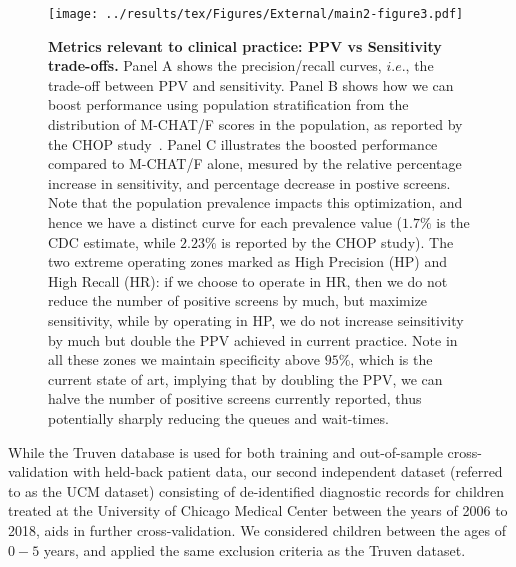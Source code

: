 \documentclass[onecolumn, compsoc,11pt]{IEEEtran}
\renewcommand{\captionN}[1]{\caption{\color{CadetBlue4!80!black} \sffamily \fontsize{9}{10}\selectfont #1  }}
\begin{document}
\begin{figure}[t]
  \tikzexternalenable
  \vspace{-10pt}

  \centering
  
  \def\AXISCOL{white}
  \def\TEXTCOL{gray}
   \texttt{[image: ../results/tex/Figures/External/main2-figure3.pdf]}

 \vspace{-10pt}

 \captionN{\textbf{Metrics relevant to clinical practice: PPV vs Sensitivity trade-offs.} Panel A shows the precision/recall curves, $i.e.$,  the trade-off between PPV and sensitivity. Panel B shows how we can boost performance using population stratification from the distribution of M-CHAT/F scores in the population, as reported by the CHOP study~\cite{pmid31562252}. Panel C illustrates the boosted performance compared to M-CHAT/F alone,
   mesured by the relative percentage increase in sensitivity, and percentage decrease in postive screens. Note that the population prevalence impacts this optimization, and hence  we have  a distinct  curve for each prevalence value ($1.7\%$ is the CDC estimate, while $2.23\%$ is reported by the CHOP study).  The two extreme operating zones marked as High Precision (HP) and High Recall (HR): if we choose to operate in HR, then we do not reduce the number of positive screens by much, but maximize sensitivity, while by operating in HP, we do not increase seinsitivity by much but double the PPV achieved in current practice. Note in all these zones we maintain specificity above $95\%$, which is the current state of art, implying that by doubling the PPV, we can halve the number of positive screens currently reported, thus potentially sharply reducing the queues and wait-times. }\label{figprc}
\end{figure}

While the Truven database is used for both training and out-of-sample cross-validation with held-back patient data, our second independent dataset (referred to as the UCM dataset) consisting of de-identified diagnostic records for children treated at the University of Chicago Medical Center between the years of 2006 to 2018, aids in further cross-validation. We considered children between the ages of $0-5$ years, and  applied the same exclusion criteria as the Truven dataset.
\end{document}
